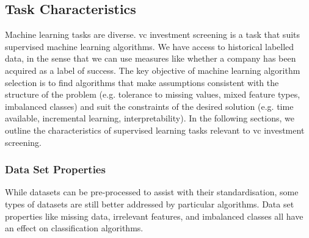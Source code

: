 \documentclass[../thesis/thesis.tex]{subfiles}
\begin{document}

\subsection{Task Characteristics}

Machine learning tasks are diverse. \Gls{vc} investment screening is a task that suits supervised machine learning algorithms. We have access to historical labelled data, in the sense that we can use measures like whether a company has been acquired as a label of success. The key objective of machine learning algorithm selection is to find algorithms that make assumptions consistent with the structure of the problem (e.g. tolerance to missing values, mixed feature types, imbalanced classes) and suit the constraints of the desired solution (e.g. time available, incremental learning, interpretability). In the following sections, we outline the characteristics of supervised learning tasks relevant to \gls{vc} investment screening.

\subsubsection{Data Set Properties}

While datasets can be pre-processed to assist with their standardisation, some types of datasets are still better addressed by particular algorithms. Data set properties like missing data, irrelevant features, and imbalanced classes all have an effect on classification algorithms.
\end{document}
